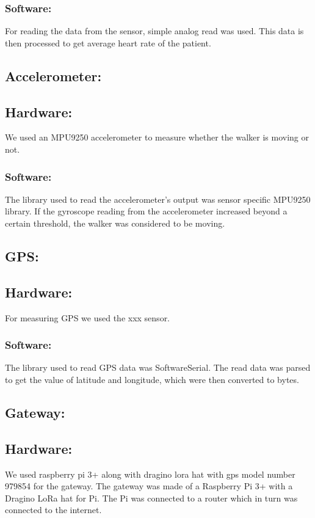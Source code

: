 \subsubsection{Software:}
For reading the data from the sensor, simple analog read was used. This data is then processed to get average heart rate of the patient.



\subsection{Accelerometer:}

\subsection{Hardware:}
We used an MPU9250 accelerometer to measure whether the walker is moving or not.

\subsubsection{Software:}
The library used to read the accelerometer's output was sensor specific MPU9250 library. If the gyroscope reading from the accelerometer increased beyond a certain threshold, the walker was considered to be moving.


\subsection{GPS:}

\subsection{Hardware:}
For measuring GPS we used the xxx sensor.

\subsubsection{Software:}
The library used to read GPS data was SoftwareSerial. The read data was parsed to get the value of latitude and longitude, which were then converted to bytes.



\subsection{Gateway:}

\subsection{Hardware:}
We used raspberry pi 3+ along with dragino lora hat with gps model number 979854 for the gateway.
The gateway was made of a Raspberry Pi 3+ with a Dragino LoRa hat for Pi. The Pi was connected to a router which in turn was connected to the internet.



